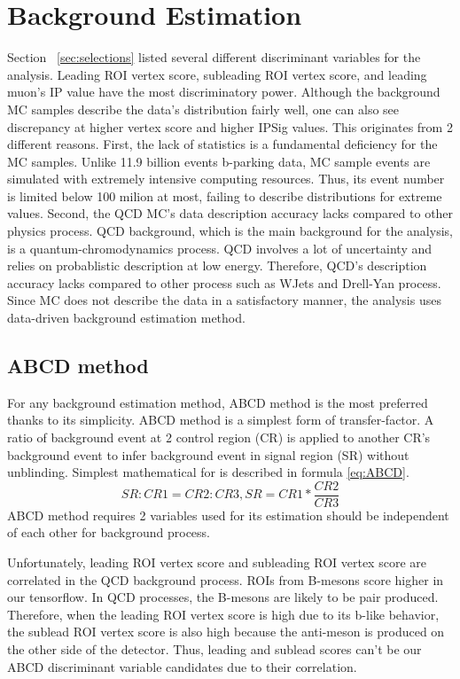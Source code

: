 \clearpage
\chapter{Background Estimation}\label{sec:estimate}

Section ~\ref{sec:selections} listed several different discriminant variables for the analysis.
Leading ROI vertex score, subleading ROI vertex score, and leading muon's IP value have the most discriminatory power.
Although the background MC samples describe the data's distribution fairly well, one can also see discrepancy at higher vertex score and higher IPSig values.
This originates from 2 different reasons.
First, the lack of statistics is a fundamental deficiency for the MC samples.
Unlike 11.9 billion events b-parking data, MC sample events are simulated with extremely intensive computing resources.
Thus, its event number is limited below 100 milion at most, failing to describe distributions for extreme values.
Second, the QCD MC's data description accuracy lacks compared to other physics process.
QCD background, which is the main background for the analysis, is a quantum-chromodynamics process.
QCD involves a lot of uncertainty and relies on probablistic description at low energy.
Therefore, QCD's description accuracy lacks compared to other process such as WJets and Drell-Yan process.
Since MC does not describe the data in a satisfactory manner, the analysis uses data-driven background estimation method.


\section{ABCD method}
For any background estimation method, ABCD method is the most preferred thanks to its simplicity.
ABCD method is a simplest form of transfer-factor.
A ratio of background event at 2 control region (CR) is applied to another CR's background event to infer background event in signal region (SR) without unblinding.
Simplest mathematical for is described in formula \ref{eq:ABCD}.
\begin{equation}
\label{eq:ABCD}
	SR:CR1=CR2:CR3, SR=CR1*\frac{CR2}{CR3} 
\end{equation}
ABCD method requires 2 variables used for its estimation should be independent of each other for background process.


Unfortunately, leading ROI vertex score and subleading ROI vertex score are correlated in the QCD background process.
ROIs from B-mesons score higher in our tensorflow.
In QCD processes, the B-mesons are likely to be pair produced.
Therefore, when the leading ROI vertex score is high due to its b-like behavior, the sublead ROI vertex score is also high because the anti-meson is produced on the other side of the detector.
Thus, leading and sublead scores can't be our ABCD discriminant variable candidates due to their correlation.

